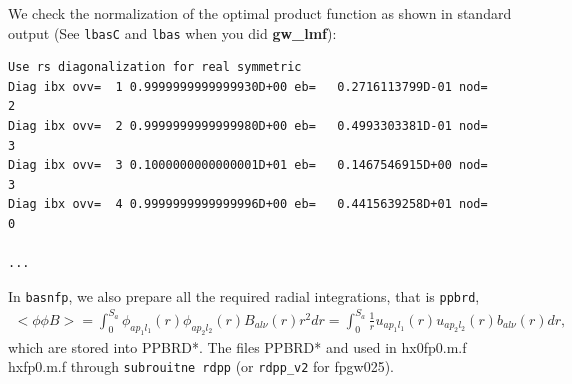 \documentclass[a4paper,10pt,epsf,fleqn]{article}
\begin{document}
{{{\begin{thebibliography}{00}
We check the normalization of the optimal product function
as shown in standard output 
(See \verb|lbasC| and \verb|lbas| when you did {\bf gw\_lmf}):

{\baselineskip=4mm
\begin{verbatim}
Use rs diagonalization for real symmetric 
Diag ibx ovv=  1 0.9999999999999930D+00 eb=   0.2716113799D-01 nod=   2
Diag ibx ovv=  2 0.9999999999999980D+00 eb=   0.4993303381D-01 nod=   3
Diag ibx ovv=  3 0.1000000000000001D+01 eb=   0.1467546915D+00 nod=   3
Diag ibx ovv=  4 0.9999999999999996D+00 eb=   0.4415639258D+01 nod=   0

...
\end{verbatim}
}

In \verb|basnfp|, we also prepare all the required 
radial integrations, that is \verb|ppbrd|,
\begin{eqnarray}
   <\phi \phi B> = \int_0^{S_a}
   \phi_{ap_1 l_1}(r) \phi_{ap_2 l_2}(r) B_{al\nu}(r) r^2 dr
   = \int_0^{S_a} \frac{1}{r}
     u_{ap_1l_1}(r) u_{ap_2l_2}(r) b_{al\nu}(r) dr,
\end{eqnarray}
which are stored into {\sf PPBRD*}.  The files {\sf PPBRD*} and used 
in {\sf hx0fp0.m.f hxfp0.m.f} through \verb#subrouitne rdpp# 
(or \verb#rdpp_v2# for fpgw025).




\end{thebibliography}}}}
\end{document}
